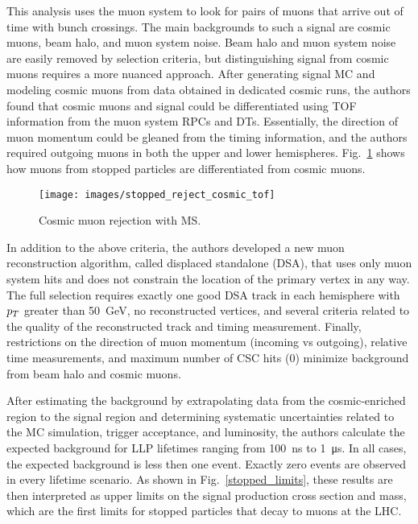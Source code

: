 \documentclass[12pt]{article}
\begin{document}
        This analysis uses the muon system to look for pairs of muons that arrive out of time with bunch crossings. The main backgrounds to such a signal are cosmic muons, beam halo, and muon system noise. Beam halo and muon system noise are easily removed by selection criteria, but distinguishing signal from cosmic muons requires a more nuanced approach. After generating signal MC and modeling cosmic muons from data obtained in dedicated cosmic runs, the authors found that cosmic muons and signal could be differentiated using TOF information from the muon system RPCs and DTs. Essentially, the direction of muon momentum could be gleaned from the timing information, and the authors required outgoing muons in both the upper and lower hemispheres. Fig.~\ref{stopped_muon_differentiation} shows how muons from stopped particles are differentiated from cosmic muons.
        
        \noindent \begin{figure}[htbp] \begin{center}
        \texttt{[image: images/stopped\_reject\_cosmic\_tof]}
        \caption{Cosmic muon rejection with MS.}
        \label{stopped_muon_differentiation}
        \end{center} \end{figure}

        In addition to the above criteria, the authors developed a new muon reconstruction algorithm, called displaced standalone (DSA), that uses only muon system hits and does not constrain the location of the primary vertex in any way. The full selection requires exactly one good DSA track in each hemisphere with $p_T$ greater than \SI{50}{\giga\electronvolt}, no reconstructed vertices, and several criteria related to the quality of the reconstructed track and timing measurement. Finally, restrictions on the direction of muon momentum (incoming vs outgoing), relative time measurements, and maximum number of CSC hits (0) minimize background from beam halo and cosmic muons.

        After estimating the background by extrapolating data from the cosmic-enriched region to the signal region and determining systematic uncertainties related to the MC simulation, trigger acceptance, and luminosity, the authors calculate the expected background for LLP lifetimes ranging from \SI{100}{\nano\s} to \SI{1}{\micro\s}. In all cases, the expected background is less then one event. Exactly zero events are observed in every lifetime scenario. As shown in Fig.~\ref{stopped_limits}, these results are then interpreted as upper limits on the signal production cross section and mass, which are the first limits for stopped particles that decay to muons at the LHC.
\end{document}
